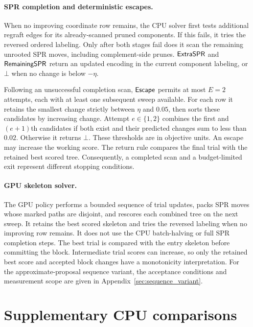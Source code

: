 \paragraph{SPR completion and deterministic escapes.}
When no improving coordinate row remains, the CPU solver first tests additional regraft edges for its already-scanned pruned components.
If this fails, it tries the reversed ordered labeling.
Only after both stages fail does it scan the remaining unrooted SPR moves, including complement-side prunes.
$\mathsf{ExtraSPR}$ and $\mathsf{RemainingSPR}$ return an updated encoding in the current component labeling, or $\bot$ when no change is below $-\eta$.

Following an unsuccessful completion scan, $\mathsf{Escape}$ permits at most $E=2$ attempts, each with at least one subsequent sweep available.
For each row it retains the smallest change strictly between $\eta$ and $0.05$, then sorts these candidates by increasing change.
Attempt $e\in\{1,2\}$ combines the first and $(e+1)$th candidates if both exist and their predicted changes sum to less than $0.02$.
Otherwise it returns $\bot$.
These thresholds are in objective units.
An escape may increase the working score. The return rule compares the final trial with the retained best scored tree.
Consequently, a completed scan and a budget-limited exit represent different stopping conditions.

\paragraph{GPU skeleton solver.}
The GPU policy performs a bounded sequence of trial updates, packs SPR moves whose marked paths are disjoint, and rescores each combined tree on the next sweep.
It retains the best scored skeleton and tries the reversed labeling when no improving row remains.
It does not use the CPU batch-halving or full SPR completion steps.
The best trial is compared with the entry skeleton before committing the block.
Intermediate trial scores can increase, so only the retained best score and accepted block changes have a monotonicity interpretation.
For the approximate-proposal sequence variant, the acceptance conditions and measurement scope are given in Appendix~\ref{sec:sequence_variant}.

\section{Supplementary CPU comparisons}
\label{sec:cpu_tables}

